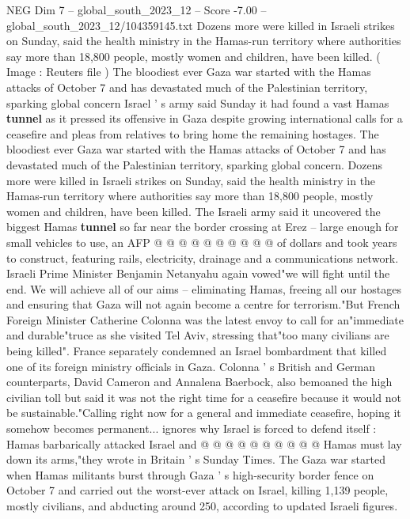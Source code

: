 \begin{textsample}{NEG Dim 7 – global\_south\_2023\_12 – Score -7.00 – global\_south\_2023\_12/104359145.txt}  \label{ex:f7_neg_414}
Dozens more were killed in Israeli strikes on Sunday, said the health ministry in the Hamas-run territory where authorities say more than 18,800 people, mostly women and children, have been killed. ( Image : Reuters file ) The bloodiest ever Gaza war started with the Hamas attacks of October 7 and has devastated much of the Palestinian territory, sparking global concern Israel ' s army said Sunday it had found a vast Hamas \textbf{tunnel} as it pressed its offensive in Gaza despite growing international calls for a ceasefire and pleas from relatives to bring home the remaining hostages.
The bloodiest ever Gaza war started with the Hamas attacks of October 7 and has devastated much of the Palestinian territory, sparking global concern.
Dozens more were killed in Israeli strikes on Sunday, said the health ministry in the Hamas-run territory where authorities say more than 18,800 people, mostly women and children, have been killed.
The Israeli army said it uncovered the biggest Hamas \textbf{tunnel} so far near the border crossing at Erez -- large enough for small vehicles to use, an AFP @ @ @ @ @ @ @ @ @ @ of dollars and took years to construct, featuring rails, electricity, drainage and a communications network.
Israeli Prime Minister Benjamin Netanyahu again vowed"we will fight until the end.
We will achieve all of our aims -- eliminating Hamas, freeing all our hostages and ensuring that Gaza will not again become a centre for terrorism."But French Foreign Minister Catherine Colonna was the latest envoy to call for an"immediate and durable"truce as she visited Tel Aviv, stressing that"too many civilians are being killed".
France separately condemned an Israel bombardment that killed one of its foreign ministry officials in Gaza.
Colonna ' s British and German counterparts, David Cameron and Annalena Baerbock, also bemoaned the high civilian toll but said it was not the right time for a ceasefire because it would not be sustainable."Calling right now for a general and immediate ceasefire, hoping it somehow becomes permanent... ignores why Israel is forced to defend itself : Hamas barbarically attacked Israel and @ @ @ @ @ @ @ @ @ @ Hamas must lay down its arms,"they wrote in Britain ' s Sunday Times.
The Gaza war started when Hamas militants burst through Gaza ' s high-security border fence on October 7 and carried out the worst-ever attack on Israel, killing 1,139 people, mostly civilians, and abducting around 250, according to updated Israeli figures.

\end{textsample}
